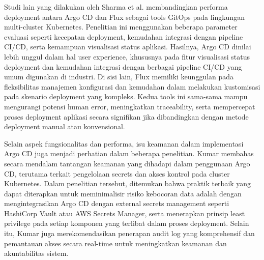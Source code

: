 Studi lain yang dilakukan oleh Sharma et al. \cite{Sharma2022} membandingkan
performa deployment antara Argo CD dan Flux sebagai tools GitOps pada
lingkungan multi-cluster Kubernetes. Penelitian ini menggunakan beberapa
parameter evaluasi seperti kecepatan deployment, kemudahan integrasi dengan
pipeline CI/CD, serta kemampuan visualisasi status aplikasi. Hasilnya, Argo CD
dinilai lebih unggul dalam hal user experience, khususnya pada fitur
visualisasi status deployment dan kemudahan integrasi dengan berbagai pipeline
CI/CD yang umum digunakan di industri. Di sisi lain, Flux memiliki keunggulan
pada fleksibilitas manajemen konfigurasi dan kemudahan dalam melakukan
kustomisasi pada skenario deployment yang kompleks. Kedua tools ini sama-sama
mampu mengurangi potensi human error, meningkatkan traceability, serta
mempercepat proses deployment aplikasi secara signifikan jika dibandingkan
dengan metode deployment manual atau konvensional.

Selain aspek fungsionalitas dan performa, isu keamanan dalam implementasi Argo
CD juga menjadi perhatian dalam beberapa penelitian. Kumar \cite{Kumar2023}
membahas secara mendalam tantangan keamanan yang dihadapi dalam penggunaan Argo
CD, terutama terkait pengelolaan secrets dan akses kontrol pada cluster
Kubernetes. Dalam penelitian tersebut, ditemukan bahwa praktik terbaik yang
dapat diterapkan untuk meminimalisir risiko kebocoran data adalah dengan
mengintegrasikan Argo CD dengan external secrets management seperti HashiCorp
Vault atau AWS Secrets Manager, serta menerapkan prinsip least privilege pada
setiap komponen yang terlibat dalam proses deployment. Selain itu, Kumar juga
merekomendasikan penerapan audit log yang komprehensif dan pemantauan akses
secara real-time untuk meningkatkan keamanan dan akuntabilitas sistem.

